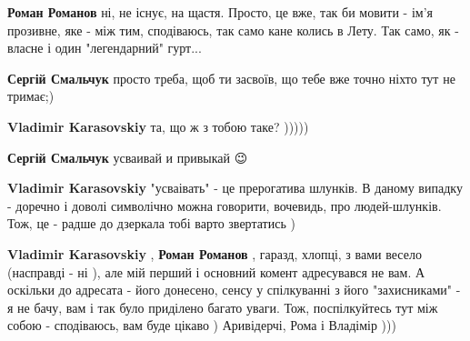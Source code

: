 \begin{itemize}
\begin{itemize}
\textbf{Роман Романов} ні, не існує, на щастя. Просто, це вже, так би мовити - ім'я прозивне, яке - між тим, сподіваюсь, так само кане колись в Лету. Так само, як - власне і один "легендарний" гурт...

 
\textbf{Сергій Смальчук} просто треба, щоб ти засвоїв, що тебе вже точно ніхто тут не тримає;)

 
\textbf{Vladimir Karasovskiy} та, що ж з тобою таке? )))))

 
\textbf{Сергій Смальчук} усваивай и привыкай 😉

 
\textbf{Vladimir Karasovskiy} "усваівать" - це прерогатива шлунків. В даному випадку - доречно і доволі символічно можна говорити, вочевидь, про людей-шлунків. Тож, це - радше до дзеркала тобі варто звертатись )

 
\textbf{Vladimir Karasovskiy} , \textbf{Роман Романов} , гаразд, хлопці, з вами
весело (насправді - ні \Smiley[1.0][yellow] ), але мій перший і основний комент адресувався не
вам. А оскільки до адресата - його донесено, сенсу у спілкуванні з його
"захисниками" - я не бачу, вам і так було приділено багато уваги. Тож,
поспілкуйтесь тут між собою - сподіваюсь, вам буде цікаво ) Аривідерчі, Рома і
Владімір )))


\end{itemize}
\end{itemize}

